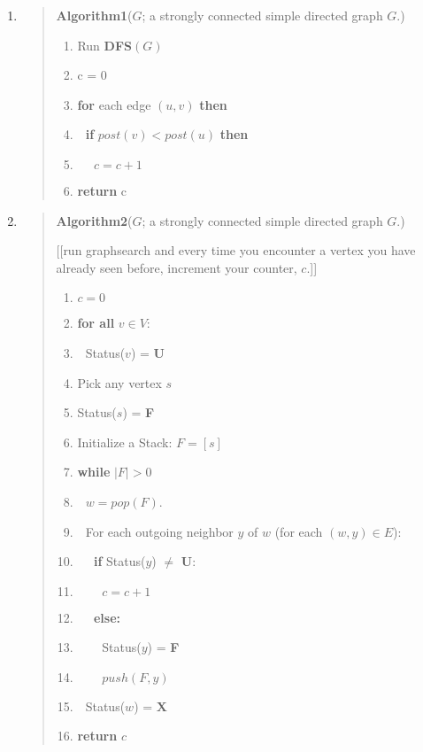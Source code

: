 \documentclass[10pt,letterpaper,unboxed,cm]{article}
\newcommand{\ind}{$~~~$}
\begin{document}
\begin{enumerate}
\begin{enumerate}


\break
\item
\begin{quote}
{\bf Algorithm1}($G$; a strongly connected simple directed graph $G$.)

\begin{enumerate}[1.]
\item
Run {\bf DFS}$(G)$
\item
c = 0
\item
{\bf for} each edge $(u,v)$ {\bf then}
\item
\ind {\bf if} $post(v)<post(u)$ {\bf then}
\item
\ind\ind $c = c + 1$
\item
{\bf return} c
\end{enumerate}
\end{quote}

\item
\begin{quote}
{\bf Algorithm2}($G$; a strongly connected simple directed graph $G$.)

[[run graphsearch and every time you encounter a vertex you have already seen before, increment your counter, $c$.]]

\begin{enumerate}[1.]
\item
$c = 0$
\item
{\bf for all} $v\in V$:
\item
\ind Status($v$) = {\bf U}
\item
Pick any vertex $s$
\item
Status($s$) = {\bf F}
\item
Initialize a Stack: $F = [s]$
\item
{\bf while} $|F| > 0$
\item
\ind $w = pop(F)$.
\item
\ind For each outgoing neighbor $y$ of $w$ (for each $(w,y)\in E$):
\item
\ind\ind {\bf if} Status($y$) $\neq$ {\bf U}:
\item
\ind\ind\ind $c = c+1$
\item
\ind\ind {\bf else:}
\item
\ind\ind\ind Status($y$) = {\bf F}
\item
\ind\ind\ind $push(F,y)$
\item
\ind Status($w$) = {\bf X}
\item
{\bf return} $c$
\end{enumerate}
\end{quote}





\end{enumerate}
\end{enumerate}
\end{document}
